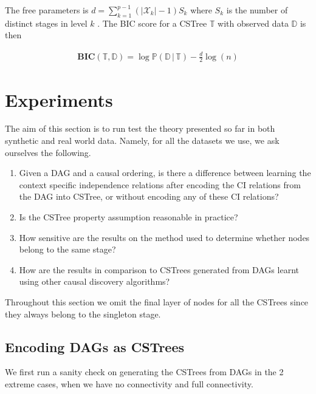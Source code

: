 \documentclass{tufte-book}
\begin{document}
The free parameters is \(d=\sum_{k=1}^{p-1} (|\mathcal{X}_k| - 1)S_k\) where \(S_k\) is the number of distinct stages in level \(k\) \cite{duarte-2021-repres-learn}. The  BIC score for a CSTree \(\mathbb{T}\) with observed data \(\mathbb{D}\) is then

\begin{align*}
\textbf{BIC}(\mathbb{T},\mathbb{D}) = \log\mathbb{P}(\mathbb{D}\,|\,\mathbb{T}) - \frac{d}{2}\log(n)
\end{align*}



\chapter{Experiments}
\label{sec:org5f6af5a}
The aim of this section is to run test the theory presented so far in both synthetic and real world data. Namely, for all the datasets we use, we ask ourselves the following.
\begin{enumerate}
\item Given a DAG and a causal ordering, is there a difference between learning the context specific independence relations after encoding the CI relations from the DAG into CSTree, or without encoding any of these CI relations?
\item Is the CSTree property assumption reasonable in practice?
\item How sensitive are the results on the method used to determine whether nodes belong to the same stage?
\item How are the results in comparison to CSTrees generated from DAGs learnt using other causal discovery algorithms?
\end{enumerate}


Throughout this section we omit the final layer of nodes for all the CSTrees since they always belong to the singleton stage.


\section{Encoding DAGs as CSTrees}
\label{sec:orgcc85d7e}
We first run a sanity check on generating the CSTrees from DAGs in the 2 extreme cases, when we have no connectivity and full connectivity.
\end{document}
